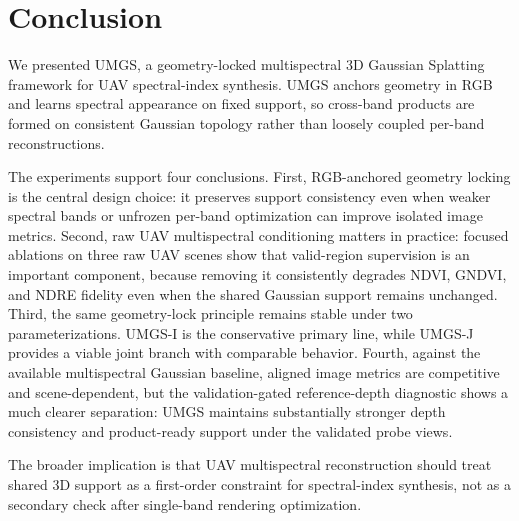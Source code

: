 \section{Conclusion}

We presented UMGS, a geometry-locked multispectral 3D Gaussian Splatting framework for UAV spectral-index synthesis. UMGS anchors geometry in RGB and learns spectral appearance on fixed support, so cross-band products are formed on consistent Gaussian topology rather than loosely coupled per-band reconstructions.

The experiments support four conclusions. First, RGB-anchored geometry locking is the central design choice: it preserves support consistency even when weaker spectral bands or unfrozen per-band optimization can improve isolated image metrics. Second, raw UAV multispectral conditioning matters in practice: focused ablations on three raw UAV scenes show that valid-region supervision is an important component, because removing it consistently degrades NDVI, GNDVI, and NDRE fidelity even when the shared Gaussian support remains unchanged. Third, the same geometry-lock principle remains stable under two parameterizations. UMGS-I is the conservative primary line, while UMGS-J provides a viable joint branch with comparable behavior. Fourth, against the available multispectral Gaussian baseline, aligned image metrics are competitive and scene-dependent, but the validation-gated reference-depth diagnostic shows a much clearer separation: UMGS maintains substantially stronger depth consistency and product-ready support under the validated probe views.

The broader implication is that UAV multispectral reconstruction should treat shared 3D support as a first-order constraint for spectral-index synthesis, not as a secondary check after single-band rendering optimization.
